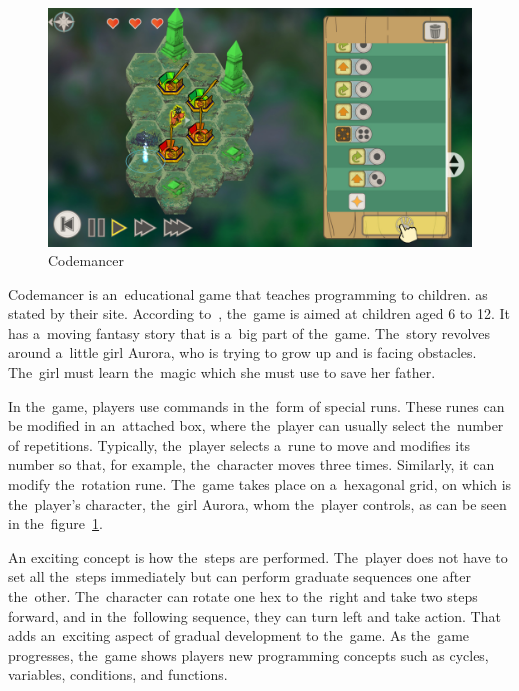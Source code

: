 \begin{figure}
    \centering
    \includegraphics[width=1\linewidth]{assets/similar-games/codemancer.jpg}
    \caption{Codemancer~\cite{a2021_codemancer}}
    \label{fig:codemancer}
\end{figure}

Codemancer is an~educational game that teaches programming to children.
 as stated by their site.
According to~\cite{a2021_codemancer}, the~game is aimed at children aged 6 to 12.
It has a~moving fantasy story that is a~big part of the~game.
The~story revolves around a~little girl Aurora, who is trying to grow up and is facing obstacles.
The~girl must learn the~magic which she must use to save her father.

In the~game, players use commands in the~form of special runs.
These runes can be modified in an~attached box, where the~player can usually select the~number of repetitions.
Typically, the~player selects a~rune to move and modifies its number so that, for example, the~character moves three times.
Similarly, it can modify the~rotation rune.
The~game takes place on a~hexagonal grid, on which is the~player's character, the~girl Aurora, whom the~player controls, as can be seen in the~figure~\ref{fig:codemancer}.

An exciting concept is how the~steps are performed.
The~player does not have to set all the~steps immediately but can perform graduate sequences one after the~other.
The~character can rotate one hex to the~right and take two steps forward, and in the~following sequence, they can turn left and take action.
That adds an~exciting aspect of gradual development to the~game.
As the~game progresses, the~game shows players new programming concepts such as cycles, variables, conditions, and functions. 

